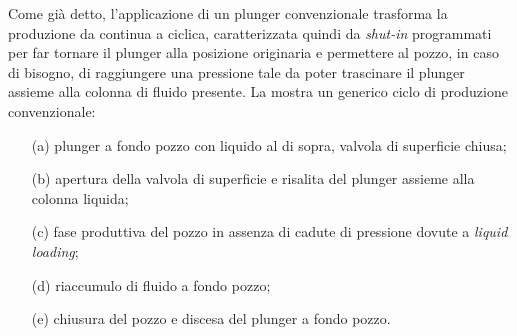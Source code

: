 Come già detto, l'applicazione di un plunger convenzionale trasforma la produzione da continua a ciclica, caratterizzata quindi da \textit{shut-in} programmati per far tornare il plunger alla posizione originaria e permettere al pozzo, in caso di bisogno, di raggiungere una pressione tale da poter trascinare il plunger assieme alla colonna di fluido presente. La  mostra un generico ciclo di produzione convenzionale:
\begin{enumerate}
    \item[(a)] plunger a fondo pozzo con liquido al di sopra, valvola di superficie chiusa;
    \item[(b)] apertura della valvola di superficie e risalita del plunger assieme alla colonna liquida;
    \item[(c)] fase produttiva del pozzo in assenza di cadute di pressione dovute a \textit{liquid loading};
    \item[(d)] riaccumulo di fluido a fondo pozzo;
    \item[(e)] chiusura del pozzo e discesa del plunger a fondo pozzo.
\end{enumerate}

